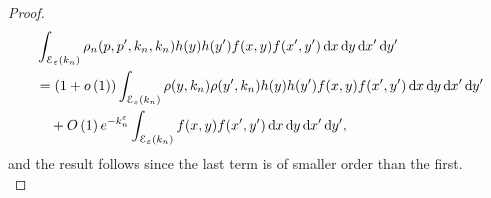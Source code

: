 \begin{proof}
\begin{align*}
	&\int_{\mathcal{E}_{\varepsilon}(k_n)} \rho_{n}(p,p^\prime,k_n,k_n) h(y) h(y^\prime) f(x,y)
		f(x^\prime,y^\prime) \dd x \dd y \dd x^\prime \dd y^\prime\\
	&=(1 + \smallO{1}) \int_{\mathcal{E}_{\varepsilon}(k_n)} \rho(y,k_n) \rho(y^\prime,k_n) h(y)h(y^\prime) 
		f(x,y)	f(x^\prime,y^\prime) \dd x \dd y \dd x^\prime \dd y^\prime\\
	&\hspace{10pt} + \bigO{1} e^{-k_n^{\varepsilon}} \int_{\mathcal{E}_{\varepsilon}(k_n)}
		f(x,y)	f(x^\prime,y^\prime) \dd x \dd y \dd x^\prime \dd y^\prime,			
\end{align*}
and the result follows since the last term is of smaller order than the first.\\
\vspace{5pt}


\end{proof}
